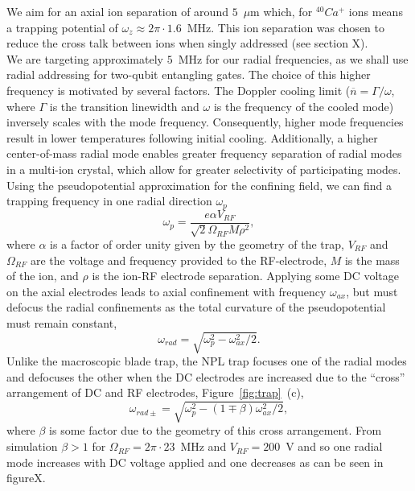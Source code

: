 \documentclass[12pt]{iopart}
\begin{document}

We aim for an axial ion
separation of around $5$~$\mu$m which, for $^{40}Ca^{+}$ ions means a
trapping potential of $\omega_z \approx 2\pi \cdot 1.6$~MHz. This ion
separation was chosen to reduce the cross talk between ions when
singly addressed (see section X).\\
We are targeting approximately $5$~MHz for our radial frequencies, as
we shall use radial addressing for two-qubit entangling gates. The choice
of this higher frequency is motivated by several factors. The Doppler
cooling limit ($\overline{n} = \Gamma/\omega$, where $\Gamma$ is the
transition linewidth and $\omega$ is the frequency of the cooled mode) 
inversely scales with the mode frequency. Consequently, higher
mode frequencies result in lower temperatures following initial
cooling. Additionally, a higher center-of-mass radial mode enables
greater frequency separation of radial modes in a multi-ion crystal,
which allow for greater selectivity of participating modes. \\
Using the pseudopotential approximation for the confining field, we can find a
trapping frequency in one radial direction $\omega_p$
$$\omega_p = \frac{e\alpha V_{RF}}{\sqrt{2}\Omega_{RF}M\rho^2},$$
where $\alpha$ is a factor of order unity given by the geometry of the trap, $V_{RF}$ and $\Omega_{RF}$ are the voltage and frequency provided to the RF-electrode, $M$ is the mass of the ion, and $\rho$ is the ion-RF electrode separation.
Applying some DC voltage on the axial electrodes leads to axial confinement with frequency $\omega_{ax}$, but must defocus the radial confinements as the total curvature of the pseudopotential must remain constant,
$$\omega_{rad} = \sqrt{\omega_p^2 - \omega_{ax}^2/2}.$$
Unlike the macroscopic blade trap, the NPL trap focuses one of
the radial modes and defocuses the other when the DC electrodes are
increased due to the ``cross'' arrangement of DC and RF electrodes,
Figure~\ref{fig:trap}~(c),
$$\omega_{rad\pm} = \sqrt{\omega_p^2 - (1\mp\beta)\omega_{ax}^2/2},$$
where $\beta$ is some factor due to the geometry of this cross arrangement. From simulation $\beta > 1$ for $\Omega_{RF} = 2\pi\cdot 23$~MHz and $V_{RF} = 200$~V and so one radial mode increases with DC voltage applied and one decreases as can be seen in figureX.
\end{document}
